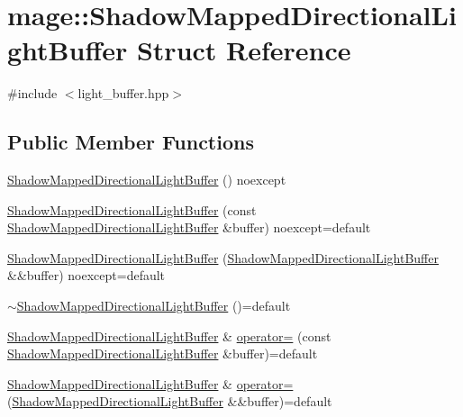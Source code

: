 \hypertarget{structmage_1_1_shadow_mapped_directional_light_buffer}{}\section{mage\+:\+:Shadow\+Mapped\+Directional\+Light\+Buffer Struct Reference}
\label{structmage_1_1_shadow_mapped_directional_light_buffer}


{\ttfamily \#include $<$light\+\_\+buffer.\+hpp$>$}

\subsection*{Public Member Functions}
\begin{DoxyCompactItemize}
\item 
\hyperlink{structmage_1_1_shadow_mapped_directional_light_buffer_a3375874624b392b0ecf4d88c25a9c82b}{Shadow\+Mapped\+Directional\+Light\+Buffer} () noexcept
\item 
\hyperlink{structmage_1_1_shadow_mapped_directional_light_buffer_a45eed8c29165d683e6bee243c4193eee}{Shadow\+Mapped\+Directional\+Light\+Buffer} (const \hyperlink{structmage_1_1_shadow_mapped_directional_light_buffer}{Shadow\+Mapped\+Directional\+Light\+Buffer} \&buffer) noexcept=default
\item 
\hyperlink{structmage_1_1_shadow_mapped_directional_light_buffer_a333731fdab65ae9c05f64f36ddb8cac0}{Shadow\+Mapped\+Directional\+Light\+Buffer} (\hyperlink{structmage_1_1_shadow_mapped_directional_light_buffer}{Shadow\+Mapped\+Directional\+Light\+Buffer} \&\&buffer) noexcept=default
\item 
\hyperlink{structmage_1_1_shadow_mapped_directional_light_buffer_ab91282042e06117f7df5a24762ac03c6}{$\sim$\+Shadow\+Mapped\+Directional\+Light\+Buffer} ()=default
\item 
\hyperlink{structmage_1_1_shadow_mapped_directional_light_buffer}{Shadow\+Mapped\+Directional\+Light\+Buffer} \& \hyperlink{structmage_1_1_shadow_mapped_directional_light_buffer_a60019f1016a0390c13c2d1662854efd0}{operator=} (const \hyperlink{structmage_1_1_shadow_mapped_directional_light_buffer}{Shadow\+Mapped\+Directional\+Light\+Buffer} \&buffer)=default
\item 
\hyperlink{structmage_1_1_shadow_mapped_directional_light_buffer}{Shadow\+Mapped\+Directional\+Light\+Buffer} \& \hyperlink{structmage_1_1_shadow_mapped_directional_light_buffer_a901fd4d6b3c374a11b5a58c5061bd988}{operator=} (\hyperlink{structmage_1_1_shadow_mapped_directional_light_buffer}{Shadow\+Mapped\+Directional\+Light\+Buffer} \&\&buffer)=default
\end{DoxyCompactItemize}
